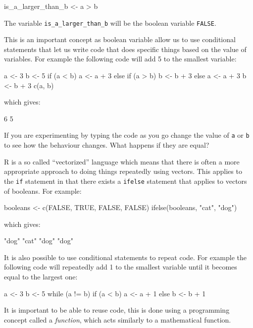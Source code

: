 \begin{Rin}
is_a_larger_than_b <- a > b
\end{Rin}

The variable \texttt{is_a_larger_than_b} will be the boolean variable
\texttt{FALSE}.

This is an important concept as boolean variable allow us to use conditional
statements that let us write code that does specific things based on the value
of variables. For example the following code will add 5 to the smallest
variable:

\begin{Rin}
a <- 3
b <- 5
if (a < b) {
  a <- a + 3
} else if (a > b) {
  b <- b + 3
} else {
  a <- a + 3
  b <- b + 3
}
c(a, b)
\end{Rin}

which gives:

\begin{Rout}
6 5
\end{Rout}

If you are experimenting by typing the code as you go change the value of
\texttt{a} or \texttt{b} to see how the behaviour changes.
What happens if they are equal?

R is a so called ``vectorized'' language which means that there is often a more
appropriate approach to doing things repeatedly using vectors. This applies to
the \texttt{if} statement in that there exists a \texttt{ifelse}
statement that applies to vectors of booleans. For example:

\begin{Rin}
booleans <- c(FALSE, TRUE, FALSE, FALSE)
ifelse(booleans, "cat", "dog")
\end{Rin}

which gives:

\begin{Rout}
"dog" "cat" "dog" "dog"
\end{Rout}

It is also possible to use conditional statements to repeat code. For
example the following code will repeatedly add 1 to the smallest variable until
it becomes equal to the largest one:

\begin{Rin}
a <- 3
b <- 5
while (a != b) {
  if (a < b) {
    a <- a + 1
  }
  else {
    b <- b + 1
  }
}
\end{Rin}

It is important to be able to reuse code, this is done using a programming
concept called a \textit{function}, which acts similarly to a mathematical
function.

